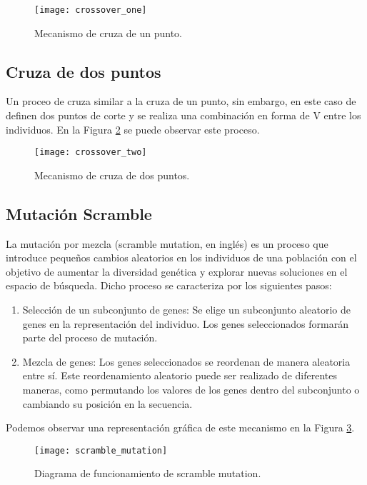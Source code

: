 \begin{figure}[htbp]
	\centering
	\texttt{[image: crossover\_one]}
	\caption{Mecanismo de cruza de un punto.}
	\label{fig: cross_one}
\end{figure}


\subsection{Cruza de dos puntos}
Un proceo de cruza similar a la cruza de un punto, sin embargo, en este caso de definen dos puntos de corte y se realiza una combinación en forma de V entre los individuos. En la Figura \ref{fig: cross_two} se puede observar este proceso.

\begin{figure}[htbp]
	\centering
	\texttt{[image: crossover\_two]}
	\caption{Mecanismo de cruza de dos puntos.}
	\label{fig: cross_two}
\end{figure}


\subsection{Mutación Scramble}
La mutación por mezcla (scramble mutation, en inglés) es un proceso que introduce pequeños cambios aleatorios en los individuos de una población con el objetivo de aumentar la diversidad genética y explorar nuevas soluciones en el espacio de búsqueda. Dicho proceso se caracteriza por los siguientes pasos:

\begin{enumerate}
	\item Selección de un subconjunto de genes: Se elige un subconjunto aleatorio de genes en la representación del individuo. Los genes seleccionados formarán parte del proceso de mutación.
	\item Mezcla de genes: Los genes seleccionados se reordenan de manera aleatoria entre sí. Este reordenamiento aleatorio puede ser realizado de diferentes maneras, como permutando los valores de los genes dentro del subconjunto o cambiando su posición en la secuencia.
\end{enumerate}

Podemos observar una representación gráfica de este mecanismo en la Figura \ref{fig:scrM}.

\begin{figure}[htbp]
	\centering
	\texttt{[image: scramble\_mutation]}
	\caption{Diagrama de funcionamiento de scramble mutation.}
	\label{fig:scrM}
\end{figure}


